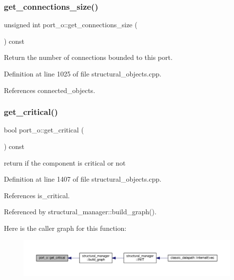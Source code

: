 \subsubsection{\texorpdfstring{get\+\_\+connections\+\_\+size()}{get\_connections\_size()}}
{\footnotesize\ttfamily unsigned int port\+\_\+o\+::get\+\_\+connections\+\_\+size (\begin{DoxyParamCaption}{ }\end{DoxyParamCaption}) const}



Return the number of connections bounded to this port. 



Definition at line 1025 of file structural\+\_\+objects.\+cpp.



References connected\+\_\+objects.

\mbox{\label{structport__o_a475699aaee28f3ae25db250091542a2b}} 
\subsubsection{\texorpdfstring{get\+\_\+critical()}{get\_critical()}}
{\footnotesize\ttfamily bool port\+\_\+o\+::get\+\_\+critical (\begin{DoxyParamCaption}{ }\end{DoxyParamCaption}) const}



return if the component is critical or not 



Definition at line 1407 of file structural\+\_\+objects.\+cpp.



References is\+\_\+critical.



Referenced by structural\+\_\+manager\+::build\+\_\+graph().

Here is the caller graph for this function\+:
\nopagebreak
\begin{figure}[H]
\begin{center}
\leavevmode
\includegraphics[width=350pt]{df/d75/structport__o_a475699aaee28f3ae25db250091542a2b_icgraph}
\end{center}
\end{figure}
\mbox{\label{structport__o_a6689eba936defd0e9ba9b981ddb89e97}} 
